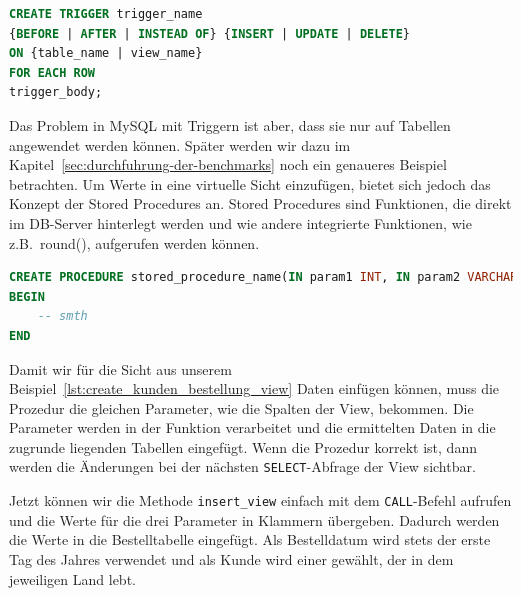 \vspace{-5pt}
\begin{lstlisting}[language=SQL,caption=Allgemeine Trigger Deklaration,label={lst:allg-trigger-dekl}]
CREATE TRIGGER trigger_name
{BEFORE | AFTER | INSTEAD OF} {INSERT | UPDATE | DELETE}
ON {table_name | view_name}
FOR EACH ROW
trigger_body;
\end{lstlisting}
\vspace{-5pt}

Das Problem in MySQL mit Triggern ist aber, dass sie nur auf Tabellen angewendet werden können.
Später werden wir dazu im Kapitel~\ref{sec:durchfuhrung-der-benchmarks} noch ein genaueres Beispiel betrachten.
Um Werte in eine virtuelle Sicht einzufügen, bietet sich jedoch das Konzept der Stored Procedures an.
Stored Procedures sind Funktionen, die direkt im DB-Server hinterlegt werden und wie andere integrierte Funktionen, wie z.B.\ round(), aufgerufen werden können.

\vspace{-5pt}
\begin{lstlisting}[language=SQL,caption=Allgemeine Prozedur Deklaration,label={lst:allg-stored-procedure-dekl}]
CREATE PROCEDURE stored_procedure_name(IN param1 INT, IN param2 VARCHAR(255))
BEGIN
    -- smth
END
\end{lstlisting}
\vspace{-5pt}

Damit wir für die Sicht aus unserem Beispiel~\ref{lst:create_kunden_bestellung_view} Daten einfügen können, muss die Prozedur die gleichen Parameter, wie die Spalten der View, bekommen.
Die Parameter werden in der Funktion verarbeitet und die ermittelten Daten in die zugrunde liegenden Tabellen eingefügt.
Wenn die Prozedur korrekt ist, dann werden die Änderungen bei der nächsten \texttt{SELECT}-Abfrage der View sichtbar.

\vspace{-5pt}


Jetzt können wir die Methode \texttt{insert\_view} einfach mit dem \texttt{CALL}-Befehl aufrufen und die Werte für die drei Parameter in Klammern übergeben.
Dadurch werden die Werte in die Bestelltabelle eingefügt.
Als Bestelldatum wird stets der erste Tag des Jahres verwendet und als Kunde wird einer gewählt, der in dem jeweiligen Land lebt.


